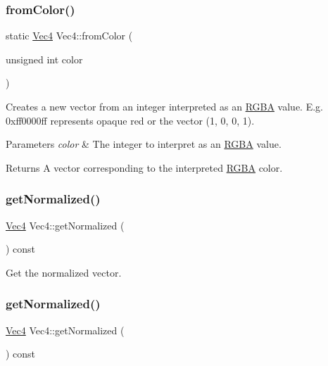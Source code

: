 \subsubsection{\texorpdfstring{from\+Color()}{fromColor()}\hspace{0.1cm}{\footnotesize\ttfamily [2/2]}}
{\footnotesize\ttfamily static \hyperlink{classVec4}{Vec4} Vec4\+::from\+Color (\begin{DoxyParamCaption}\item[{unsigned int}]{color }\end{DoxyParamCaption})\hspace{0.3cm}{\ttfamily [static]}}

Creates a new vector from an integer interpreted as an \hyperlink{structRGBA}{R\+G\+BA} value. E.\+g. 0xff0000ff represents opaque red or the vector (1, 0, 0, 1).


\begin{DoxyParams}{Parameters}
{\em color} & The integer to interpret as an \hyperlink{structRGBA}{R\+G\+BA} value.\\
\hline
\end{DoxyParams}
\begin{DoxyReturn}{Returns}
A vector corresponding to the interpreted \hyperlink{structRGBA}{R\+G\+BA} color. 
\end{DoxyReturn}
\mbox{\label{classVec4_aa5a3512165c25bf7d5d64293db3fbd64}} 
\subsubsection{\texorpdfstring{get\+Normalized()}{getNormalized()}\hspace{0.1cm}{\footnotesize\ttfamily [1/2]}}
{\footnotesize\ttfamily \hyperlink{classVec4}{Vec4} Vec4\+::get\+Normalized (\begin{DoxyParamCaption}{ }\end{DoxyParamCaption}) const}

Get the normalized vector. \mbox{\label{classVec4_aa5a3512165c25bf7d5d64293db3fbd64}} 
\subsubsection{\texorpdfstring{get\+Normalized()}{getNormalized()}\hspace{0.1cm}{\footnotesize\ttfamily [2/2]}}
{\footnotesize\ttfamily \hyperlink{classVec4}{Vec4} Vec4\+::get\+Normalized (\begin{DoxyParamCaption}{ }\end{DoxyParamCaption}) const}

